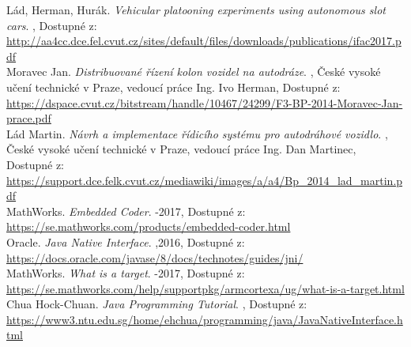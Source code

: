 \documentclass[thesis=M,czech,hidelinks]{FITthesis}[2012/06/26]
\begin{document}


\begin{thebibliography}{9}

       	Lád, Herman, Hurák. \textit{Vehicular platooning experiments	using autonomous slot cars}. , Dostupné z: \\    \url{http://aa4cc.dce.fel.cvut.cz/sites/default/files/downloads/publications/ifac2017.pdf} \\
       	
       	Moravec Jan. \textit{Distribuované řízení kolon vozidel na autodráze}. , České vysoké učení technické v Praze, vedoucí práce Ing. Ivo Herman, Dostupné z: \\    \url{https://dspace.cvut.cz/bitstream/handle/10467/24299/F3-BP-2014-Moravec-Jan-prace.pdf} \\
   
      	Lád Martin. \textit{Návrh a implementace řídicího systému pro	autodráhové vozidlo}. , České vysoké učení technické v Praze, vedoucí práce Ing. Dan Martinec, Dostupné z: \\    \url{https://support.dce.felk.cvut.cz/mediawiki/images/a/a4/Bp_2014_lad_martin.pdf} \\
      	
     	MathWorks. \textit{Embedded Coder}. -2017, Dostupné z: \\    \url{https://se.mathworks.com/products/embedded-coder.html} \\
     	
        	Oracle. \textit{Java Native Interface}. ,2016, Dostupné z: \\    \url{https://docs.oracle.com/javase/8/docs/technotes/guides/jni/} \\  	
        	
           	MathWorks. \textit{What is a target}. -2017, Dostupné z: \\    \url{https://se.mathworks.com/help/supportpkg/armcortexa/ug/what-is-a-target.html} \\
           	
       	Chua Hock-Chuan. \textit{Java Programming Tutorial}. , Dostupné z: \\    \url{https://www3.ntu.edu.sg/home/ehchua/programming/java/JavaNativeInterface.html} \\
              	

\end{thebibliography}
\end{document}
